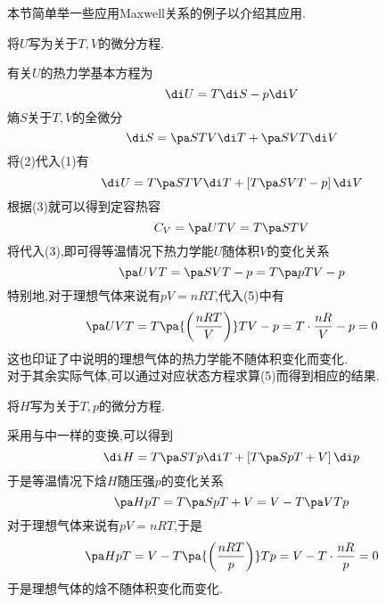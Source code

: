 \documentclass{ctexart}
\begin{document}
\indent 本节简单举一些应用Maxwell关系的例子以介绍其应用.
\begin{problem}[3F.2.2]
    将$U$写为关于$T,V$的微分方程.
\end{problem}
\begin{solution}
    有关$U$的热力学基本方程为
    \begin{equation}
        \di U=T\di S-p\di V
    \end{equation}
    熵$S$关于$T,V$的全微分
    \begin{equation}
        \di S=\pa STV\di T+\pa SVT\di V
    \end{equation}
    将(2)代入(1)有
    \begin{equation}
        \di U=T\pa STV\di T+\left[T\pa SVT-p\right]\di V
    \end{equation}
    根据(3)就可以得到定容热容
    \begin{equation}
        C_V=\pa UTV=T\pa STV
    \end{equation}
    将代入(3),即可得等温情况下热力学能$U$随体积$V$的变化关系
    \begin{equation}
        \pa UVT=\pa SVT-p=T\pa pTV-p
    \end{equation}
    特别地,对于理想气体来说有$pV=nRT$,代入(5)中有
    \begin{equation}
        \pa UVT=T\pa{\left(\frac{nRT}{V}\right)}TV-p=T\cdot\dfrac{nR}{V}-p=0
    \end{equation}
    这也印证了中说明的理想气体的热力学能不随体积变化而变化.\\
    对于其余实际气体,可以通过对应状态方程求算(5)而得到相应的结果.
\end{solution}
\begin{problem}[3F.2.3]
    将$H$写为关于$T,p$的微分方程.
\end{problem}
\begin{solution}\setcounter{equation}{0}
    采用与中一样的变换,可以得到
    \begin{equation}
        \di H=T\pa STp\di T+\left[T\pa SpT+V\right]\di p
    \end{equation}
    于是等温情况下焓$H$随压强$p$的变化关系
    \begin{equation}
        \pa HpT=T\pa SpT+V=V-T\pa VTp
    \end{equation}
    对于理想气体来说有$pV=nRT$,于是
    \begin{equation}
        \pa HpT=V-T\pa{\left(\frac{nRT}{p}\right)}Tp=V-T\cdot\dfrac{nR}{p}=0
    \end{equation}
    于是理想气体的焓不随体积变化而变化.
\end{solution}
\end{document}
